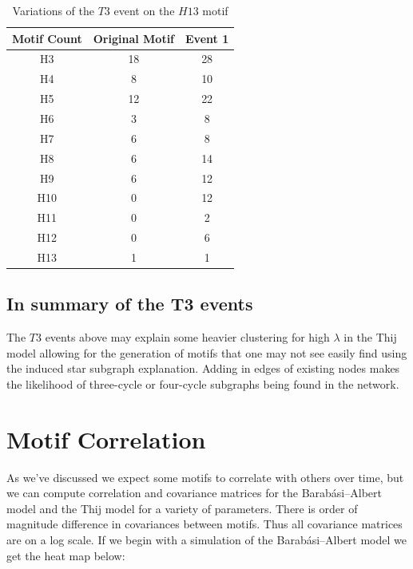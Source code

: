 \begin{table}
    \centering
    \begin{tabular}{||c c c||} 
    \hline
    Motif Count & Original Motif & Event 1\\ [0.5ex] 
    \hline\hline
    H3 & 18 & 28 \\ 
    \hline
    H4 & 8 & 10 \\
    \hline
    H5 & 12 & 22 \\
    \hline
    H6 & 3 & 8 \\
    \hline
    H7 & 6 & 8 \\
    \hline
    H8 & 6 & 14 \\
    \hline
    H9 & 6 & 12 \\
    \hline
    H10 & 0 & 12 \\
    \hline
    H11 & 0 & 2 \\
    \hline
    H12 & 0 & 6 \\
    \hline
    H13 & 1 & 1\\
    \hline
   \end{tabular}
   \caption{Variations of the $T3$ event on the $H13$ motif}
   \label{table:22}
\end{table}


\section{In summary of the T3 events}

The $T3$ events above may explain some heavier clustering for high $\lambda$ in the Thij model allowing
for the generation of motifs that one may not see easily find using the induced star subgraph explanation. 
Adding in edges of existing nodes makes the likelihood of three-cycle or four-cycle subgraphs 
being found in the network.


\chapter{Motif Correlation}
As we've discussed we expect some motifs to correlate with others over time, but we 
can compute correlation and covariance matrices for the Barabási–Albert model and the Thij model
for a variety of parameters. There is order of magnitude difference in covariances between
motifs. Thus all covariance matrices are on a log scale.  If we begin with  a simulation of the Barabási–Albert model
we get the heat map below:


